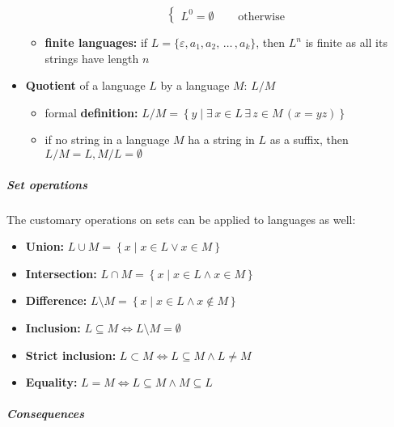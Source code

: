 \documentclass[english]{article}
\begin{document}
\begin{itemize}
\begin{itemize}
\[\begin{cases}
                    L ^ 0 = \emptyset \quad           & \text{ otherwise }
                  \end{cases}\]
          \item \textbf{finite languages:} if \(L = \{\varepsilon, a_1, a_2, \,\ldots\,, a_k\}\), then \(L^n\) is finite as all its strings have length \(n\)
        \end{itemize}
  \item \textbf{Quotient} of a language \(L\) by a language \(M\): \(L / M\)
        \begin{itemize}
          \item formal \textbf{definition:} \(L / M = \left\{y \mid \exists \, x \in L \, \exists \, z \in M \, (x = yz) \right\}\)
          \item if no string in a language \(M\) ha a string in \(L\) as a suffix, then \(L / M = L, M / L = \emptyset\)
        \end{itemize}
\end{itemize}

\subparagraph*{Set operations}

The customary operations on sets can be applied to languages as well:

\begin{itemize}
  \item \textbf{Union:} \(L \cup M = \left\{x \mid x \in L \lor x \in M \right\}\)
  \item \textbf{Intersection:} \(L \cap M = \left\{x \mid x \in L \land x \in M \right\}\)
  \item \textbf{Difference:} \(L \setminus M = \left\{x \mid x \in L \land x \notin M \right\}\)
  \item \textbf{Inclusion:} \(L \subseteq M \Leftrightarrow L \setminus M = \emptyset\)
  \item \textbf{Strict inclusion:} \(L \subset M \Leftrightarrow L \subseteq M \land L \neq M\)
  \item \textbf{Equality:} \(L = M \Leftrightarrow L \subseteq M \land M \subseteq L\)
\end{itemize}

\subparagraph*{Consequences}
\end{document}
